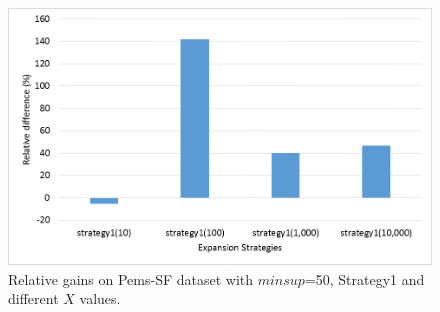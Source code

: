 \begin{figure}[!t]
\includegraphics[width=5in]{immagini_extension/pems_strategy1.png}
\caption{Relative gains on Pems-SF dataset with $minsup$=50, Strategy1 and different $X$ values.
}
\label{pems_strategy1}
\end{figure}

